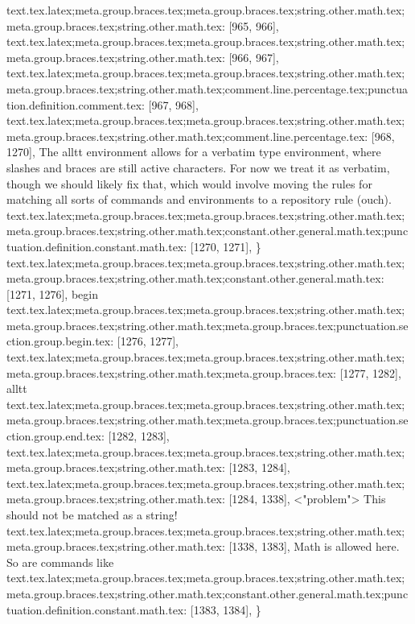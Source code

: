 {{{{{{{{{{{{{{{{{{{{{{{{{{{{{{{{text.tex.latex;meta.group.braces.tex;meta.group.braces.tex;string.other.math.tex;meta.group.braces.tex;string.other.math.tex: [965, 966], {
}
text.tex.latex;meta.group.braces.tex;meta.group.braces.tex;string.other.math.tex;meta.group.braces.tex;string.other.math.tex: [966, 967], {
}
text.tex.latex;meta.group.braces.tex;meta.group.braces.tex;string.other.math.tex;meta.group.braces.tex;string.other.math.tex;comment.line.percentage.tex;punctuation.definition.comment.tex: [967, 968], {%
text.tex.latex;meta.group.braces.tex;meta.group.braces.tex;string.other.math.tex;meta.group.braces.tex;string.other.math.tex;comment.line.percentage.tex: [968, 1270], { The alltt environment allows for a verbatim type environment, where slashes and braces are still active characters. For now we treat it as verbatim, though we should likely fix that, which would involve moving the rules for matching all sorts of commands and environments to a repository rule (ouch).
}
text.tex.latex;meta.group.braces.tex;meta.group.braces.tex;string.other.math.tex;meta.group.braces.tex;string.other.math.tex;constant.other.general.math.tex;punctuation.definition.constant.math.tex: [1270, 1271], {\}
text.tex.latex;meta.group.braces.tex;meta.group.braces.tex;string.other.math.tex;meta.group.braces.tex;string.other.math.tex;constant.other.general.math.tex: [1271, 1276], {begin}
text.tex.latex;meta.group.braces.tex;meta.group.braces.tex;string.other.math.tex;meta.group.braces.tex;string.other.math.tex;meta.group.braces.tex;punctuation.section.group.begin.tex: [1276, 1277], {{}
text.tex.latex;meta.group.braces.tex;meta.group.braces.tex;string.other.math.tex;meta.group.braces.tex;string.other.math.tex;meta.group.braces.tex: [1277, 1282], {alltt}
text.tex.latex;meta.group.braces.tex;meta.group.braces.tex;string.other.math.tex;meta.group.braces.tex;string.other.math.tex;meta.group.braces.tex;punctuation.section.group.end.tex: [1282, 1283], {}}
text.tex.latex;meta.group.braces.tex;meta.group.braces.tex;string.other.math.tex;meta.group.braces.tex;string.other.math.tex: [1283, 1284], {
}
text.tex.latex;meta.group.braces.tex;meta.group.braces.tex;string.other.math.tex;meta.group.braces.tex;string.other.math.tex: [1284, 1338], {  <"problem"> This should not be matched as a string!
}
text.tex.latex;meta.group.braces.tex;meta.group.braces.tex;string.other.math.tex;meta.group.braces.tex;string.other.math.tex: [1338, 1383], {  Math is allowed here. So are commands like }
text.tex.latex;meta.group.braces.tex;meta.group.braces.tex;string.other.math.tex;meta.group.braces.tex;string.other.math.tex;constant.other.general.math.tex;punctuation.definition.constant.math.tex: [1383, 1384], {\}
}}}}}}}}}}}}}}}}}}}}}}}}}}}}}}}}}}}
